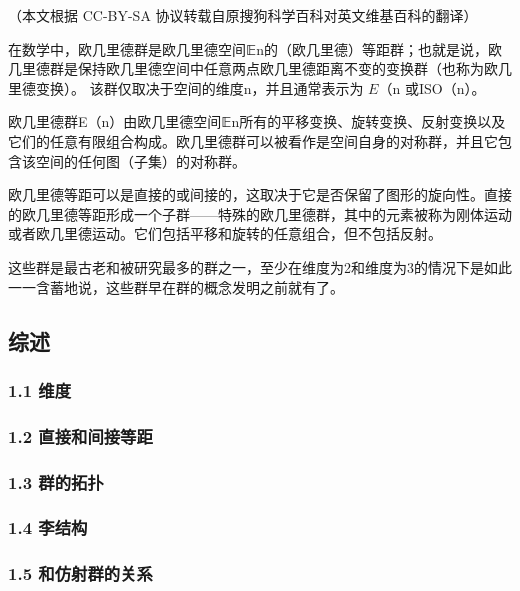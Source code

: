 
（本文根据 CC-BY-SA 协议转载自原搜狗科学百科对英文维基百科的翻译）

在数学中，欧几里德群是欧几里德空间𝔼n的（欧几里德）等距群；也就是说，欧几里德群是保持欧几里德空间中任意两点欧几里德距离不变的变换群（也称为欧几里德变换）。 该群仅取决于空间的维度n，并且通常表示为 $E$（n 或ISO（n）。

欧几里德群E（n）由欧几里德空间𝔼n所有的平移变换、旋转变换、反射变换以及它们的任意有限组合构成。欧几里德群可以被看作是空间自身的对称群，并且它包含该空间的任何图（子集）的对称群。

欧几里德等距可以是直接的或间接的，这取决于它是否保留了图形的旋向性。直接的欧几里德等距形成一个子群——特殊的欧几里德群，其中的元素被称为刚体运动或者欧几里德运动。它们包括平移和旋转的任意组合，但不包括反射。

这些群是最古老和被研究最多的群之一，至少在维度为2和维度为3的情况下是如此一一含蓄地说，这些群早在群的概念发明之前就有了。

\subsection{综述}



\subsubsection{1.1 维度}



\subsubsection{1.2 直接和间接等距}



\subsubsection{1.3 群的拓扑}



\subsubsection{1.4 李结构}



\subsubsection{1.5 和仿射群的关系}



